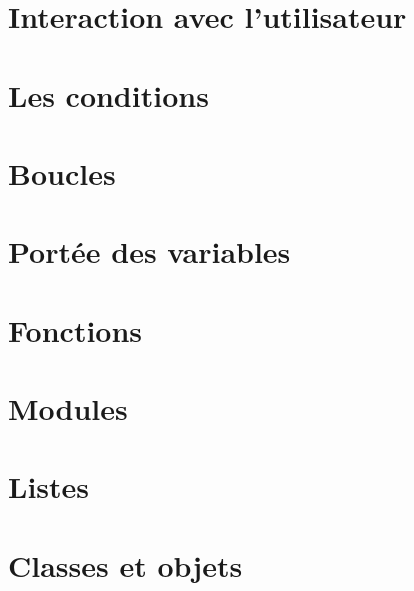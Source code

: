 \section{Interaction avec l'utilisateur}


\section{Les conditions}


\section{Boucles}


\section{Portée des variables}


\section{Fonctions}


\section{Modules}


\section{Listes}




\section{Classes et objets}



